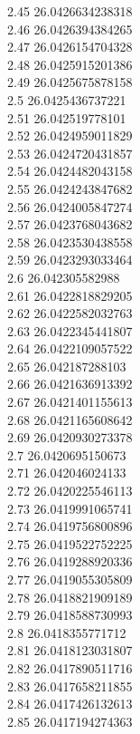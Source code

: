{2.45	26.0426634238318\\
2.46	26.0426394384265\\
2.47	26.0426154704328\\
2.48	26.0425915201386\\
2.49	26.0425675878158\\
2.5	26.0425436737221\\
2.51	26.042519778101\\
2.52	26.0424959011829\\
2.53	26.0424720431857\\
2.54	26.0424482043158\\
2.55	26.0424243847682\\
2.56	26.0424005847274\\
2.57	26.0423768043682\\
2.58	26.0423530438558\\
2.59	26.0423293033464\\
2.6	26.042305582988\\
2.61	26.0422818829205\\
2.62	26.0422582032763\\
2.63	26.0422345441807\\
2.64	26.0422109057522\\
2.65	26.042187288103\\
2.66	26.0421636913392\\
2.67	26.0421401155613\\
2.68	26.0421165608642\\
2.69	26.0420930273378\\
2.7	26.0420695150673\\
2.71	26.042046024133\\
2.72	26.0420225546113\\
2.73	26.0419991065741\\
2.74	26.0419756800896\\
2.75	26.0419522752225\\
2.76	26.0419288920336\\
2.77	26.0419055305809\\
2.78	26.0418821909189\\
2.79	26.0418588730993\\
2.8	26.0418355771712\\
2.81	26.0418123031807\\
2.82	26.0417890511716\\
2.83	26.0417658211855\\
2.84	26.0417426132613\\
2.85	26.0417194274363\\
}
